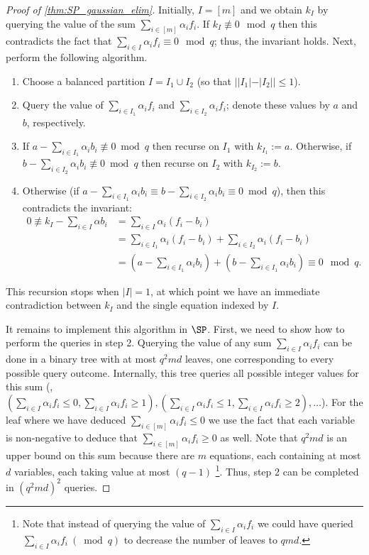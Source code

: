 \documentclass{toc}
\begin{document}
\begin{proof}[Proof of \autoref{thm:SP_gaussian_elim}]
	Initially, $I = [m]$ and we obtain $k_I$ by querying the value of the sum $\sum_{i \in [m]} \alpha_i f_i$. If $k_I \not \equiv 0 \mod q$ then this contradicts the fact that $\sum_{i \in I} \alpha_i f_i \equiv 0 \mod q$; thus, the invariant holds.  Next, perform the following algorithm.
	\begin{enumerate}
		\item Choose a balanced partition $I = I_1 \cup I_2$ (so that $||I_1|-|I_2|| \leq 1$).
		\item Query the value of $\sum_{i \in I_1} \alpha_i f_i$ and $ \sum_{i \in I_2} \alpha_i f_i$; denote these values by $a$ and $b$, respectively.
		\item If $a -\sum_{i \in I_1} \alpha_i b_i \not \equiv 0 \bmod q$ then recurse on $I_1$ with $k_{I_1} := a$. Otherwise, if $b -\sum_{i \in I_2} \alpha_i b_i \not \equiv 0 \bmod q$ then recurse on $I_2$ with $k_{I_2} := b$.
		\item Otherwise (if $a -\sum_{i \in I_1} \alpha_i b_i \equiv b -\sum_{i \in I_2} \alpha_i b_i \equiv 0 \bmod q$), then this contradicts the invariant:
			\begin{align*} 0  \not \equiv k_I - \sum_{i \in I} \alpha b_i
			&= \sum_{i \in I} \alpha_i (f_i-b_i) \\ &= \sum_{i \in I_1} \alpha_i (f_i-b_i) + \sum_{i \in I_2} \alpha_i (f_i-b_i) \\ 
			&= (a-\sum_{i\in I_1} \alpha_ib_i) + (b-\sum_{i\in I_1} \alpha_ib_i) \equiv 0 \mod q.	
			\end{align*}
	\end{enumerate}
	This recursion stops when $|I| = 1$, at which point we have an immediate contradiction between $k_I$ and the single equation indexed by $I$. 
	
	It remains to implement this algorithm in $\SP$. First, we need to show how to perform the queries in step 2. 
	Querying the value of any sum $\sum_{i \in I} \alpha_i f_i$ can be done in a binary tree with at most $q^2md$ leaves, one corresponding to every possible query outcome. Internally, this tree queries all possible integer values for this sum (\eg,  $(\sum_{i \in I} \alpha_i f_i \leq 0, \sum_{i \in I} \alpha_i f_i \geq 1), (\sum_{i \in I} \alpha_i f_i \leq 1, \sum_{i \in I} \alpha_i f_i \geq 2), \ldots$). For the leaf where we have deduced $\sum_{i \in [m]} \alpha_i f_i \leq 0$ we use the fact that each variable is non-negative to deduce that $\sum_{i \in [m]} \alpha_i f_i \geq 0$ as well. 
	Note that $q^2md$ is an upper bound on this sum because there are $m$ equations, each containing at most $d$ variables, each taking value at most $(q-1)$ \footnote{Note that instead of querying the value of $\sum_{i \in I} \alpha_i f_i$ we could have queried $\sum_{i \in I} \alpha_i f_i ~(\bmod q)$ to decrease the number of leaves to $qmd$.}. Thus, step 2 can be completed in $(q^2md)^2$ queries.
	

\end{proof}
\end{document}
